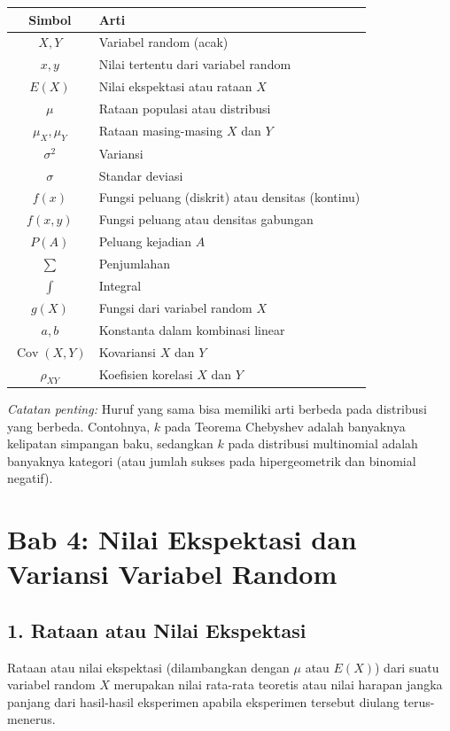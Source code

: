 \documentclass[12pt, a4paper]{article}
\begin{document}
\begin{table}[h!]
\centering
\begin{tabular}{|c|l|}
\hline
\textbf{Simbol} & \textbf{Arti} \\ \hline
$X, Y$ & Variabel random (acak) \\ \hline
$x, y$ & Nilai tertentu dari variabel random \\ \hline
$E(X)$ & Nilai ekspektasi atau rataan $X$ \\ \hline
$\mu$ & Rataan populasi atau distribusi \\ \hline
$\mu_X, \mu_Y$ & Rataan masing-masing $X$ dan $Y$ \\ \hline
$\sigma^2$ & Variansi \\ \hline
$\sigma$ & Standar deviasi \\ \hline
$f(x)$ & Fungsi peluang (diskrit) atau densitas (kontinu) \\ \hline
$f(x,y)$ & Fungsi peluang atau densitas gabungan \\ \hline
$P(A)$ & Peluang kejadian $A$ \\ \hline
$\sum$ & Penjumlahan \\ \hline
$\int$ & Integral \\ \hline
$g(X)$ & Fungsi dari variabel random $X$ \\ \hline
$a, b$ & Konstanta dalam kombinasi linear \\ \hline
$\operatorname{Cov}(X,Y)$ & Kovariansi $X$ dan $Y$ \\ \hline
$\rho_{XY}$ & Koefisien korelasi $X$ dan $Y$ \\ \hline
\end{tabular}
\end{table}

\textit{Catatan penting:} Huruf yang sama bisa memiliki arti berbeda pada distribusi yang berbeda. Contohnya, $k$ pada Teorema Chebyshev adalah banyaknya kelipatan simpangan baku, sedangkan $k$ pada distribusi multinomial adalah banyaknya kategori (atau jumlah sukses pada hipergeometrik dan binomial negatif).

\newpage
\section{Bab 4: Nilai Ekspektasi dan Variansi Variabel Random}

\subsection{1. Rataan atau Nilai Ekspektasi}
Rataan atau nilai ekspektasi (dilambangkan dengan $\mu$ atau $E(X)$) dari suatu variabel random $X$ merupakan nilai rata-rata teoretis atau nilai harapan jangka panjang dari hasil-hasil eksperimen apabila eksperimen tersebut diulang terus-menerus.
\end{document}
